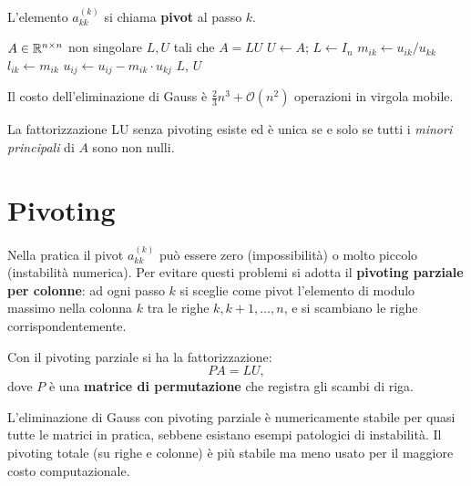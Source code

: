L'elemento $a^{(k)}_{kk}$ si chiama \textbf{pivot} al passo $k$.

\begin{algorithm}[htbp]
  \caption{Eliminazione di Gauss (fattorizzazione LU)}
  \label{alg:gauss}
  \begin{algorithmic}[1]
    \Require $A \in \mathbb{R}^{n \times n}$ non singolare
    \Ensure $L, U$ tali che $A = LU$
    \State $U \gets A$; \; $L \gets I_n$
        \State $m_{ik} \gets u_{ik} / u_{kk}$
        \State $l_{ik} \gets m_{ik}$
          \State $u_{ij} \gets u_{ij} - m_{ik} \cdot u_{kj}$
        \EndFor
      \EndFor
    \EndFor
    \State \Return $L$, $U$
  \end{algorithmic}
\end{algorithm}

Il costo dell'eliminazione di Gauss è $\frac{2}{3}n^3 + \mathcal{O}(n^2)$
operazioni in virgola mobile.

\begin{theorem}
La fattorizzazione LU senza pivoting esiste ed è unica se e solo se tutti i
\emph{minori principali} di $A$ sono non nulli.
\end{theorem}

\section{Pivoting}
\label{sec:pivoting}

Nella pratica il pivot $a^{(k)}_{kk}$ può essere zero (impossibilità) o molto
piccolo (instabilità numerica). Per evitare questi problemi si adotta il
\textbf{pivoting parziale per colonne}: ad ogni passo $k$ si sceglie come pivot
l'elemento di modulo massimo nella colonna $k$ tra le righe $k, k+1, \ldots, n$,
e si scambiano le righe corrispondentemente.

Con il pivoting parziale si ha la fattorizzazione:
\begin{equation}
  PA = LU,
  \label{eq:PLU}
\end{equation}
dove $P$ è una \textbf{matrice di permutazione} che registra gli scambi di riga.

\begin{remark}[Stabilità]
L'eliminazione di Gauss con pivoting parziale è numericamente stabile per quasi
tutte le matrici in pratica, sebbene esistano esempi patologici di instabilità.
Il pivoting totale (su righe e colonne) è più stabile ma meno usato per il
maggiore costo computazionale.
\end{remark}

